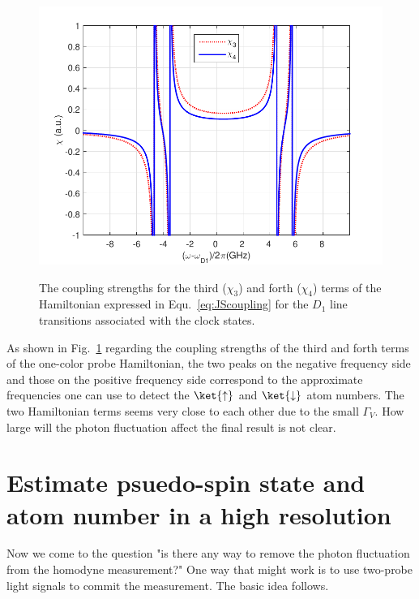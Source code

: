 \begin{figure}
\begin{minipage}{.91\linewidth}
\centering
{\includegraphics[scale=0.75]{./Figs/chi34}}
\end{minipage}
\caption{The coupling strengths for the third ($ \chi_3 $) and forth ($ \chi_4 $) terms of the Hamiltonian expressed in Equ.~\eqref{eq:JScoupling} for the $ D_1 $ line transitions associated with the clock states.} \label{fig:chi34}
\end{figure}

As shown in Fig.~\ref{fig:chi34} regarding the coupling strengths of the third and forth terms of the one-color probe Hamiltonian, the two peaks on the negative frequency side and those on the positive frequency side correspond to the approximate frequencies one can use to detect the $ \ket{\uparrow} $ and $ \ket{\downarrow} $ atom numbers. The two Hamiltonian terms seems very close to each other due to the small $ \Gamma_V $. How large will the photon fluctuation affect the final result is not clear. 

\newpage

\section{Estimate psuedo-spin state and atom number in a high resolution}
Now we come to the question "is there any way to remove the photon fluctuation from the homodyne measurement?" One way that might work is to use two-probe light signals to commit the measurement. The basic idea follows. 

